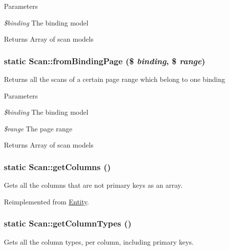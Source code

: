 \begin{DoxyParams}{Parameters}
\item[{\em \$binding}]The binding model \end{DoxyParams}
\begin{DoxyReturn}{Returns}
Array of scan models 
\end{DoxyReturn}
\hypertarget{classScan_a6b5542f995d5f444adb53595972261fa}{
\subsubsection[{fromBindingPage}]{\setlength{\rightskip}{0pt plus 5cm}static Scan::fromBindingPage (\$ {\em binding}, \/  \$ {\em range})}}
\label{classScan_a6b5542f995d5f444adb53595972261fa}
Returns all the scans of a certain page range which belong to one binding


\begin{DoxyParams}{Parameters}
\item[{\em \$binding}]The binding model \item[{\em \$range}]The page range \end{DoxyParams}
\begin{DoxyReturn}{Returns}
Array of scan models 
\end{DoxyReturn}
\hypertarget{classScan_a51a201a61df50b19fd6a7b96d7521ca5}{
\subsubsection[{getColumns}]{\setlength{\rightskip}{0pt plus 5cm}static Scan::getColumns ()}}
\label{classScan_a51a201a61df50b19fd6a7b96d7521ca5}
Gets all the columns that are not primary keys as an array. 

Reimplemented from \hyperlink{classEntity_a394717a08ffd54ec9a14d06727c86719}{Entity}.

\hypertarget{classScan_a9ae3218caa7bc866a8b914eab7b649a2}{
\subsubsection[{getColumnTypes}]{\setlength{\rightskip}{0pt plus 5cm}static Scan::getColumnTypes ()}}
\label{classScan_a9ae3218caa7bc866a8b914eab7b649a2}
Gets all the column types, per column, including primary keys.

